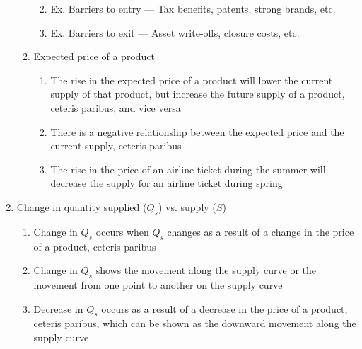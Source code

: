 \documentclass[12pt]{article}
\begin{document}
\begin{enumerate}
\begin{enumerate}
\begin{enumerate}
\begin{enumerate}
                \end{enumerate}

              \item Ex. Barriers to entry — Tax benefits, patents, strong brands, etc.
              
              \item Ex. Barriers to exit — Asset write-offs, closure costs, etc.

            \end{enumerate}

          \item Expected price of a product

            \begin{enumerate}

              \item The rise in the expected price of a product will lower the current supply of that product, but increase the future supply of a product, ceteris paribus, and vice versa

              \item There is a negative relationship between the expected price and the current supply, ceteris paribus

              \item The rise in the price of an airline ticket during the summer will decrease the supply for an airline ticket during spring

            \end{enumerate}

        \end{enumerate}

      \item Change in quantity supplied ($Q_s$) vs. supply ($S$)

        \begin{enumerate}

          \item Change in $Q_s$ occurs when $Q_s$ changes as a result of a change in the price of a product, ceteris paribus

          \item Change in $Q_s$ shows the movement along the supply curve or the movement from one point to another on the supply curve

          \item Decrease in $Q_s$ occurs as a result of a decrease in the price of a product, ceteris paribus, which can be shown as the downward movement along the supply curve


\end{enumerate}
\end{enumerate}
\end{document}
